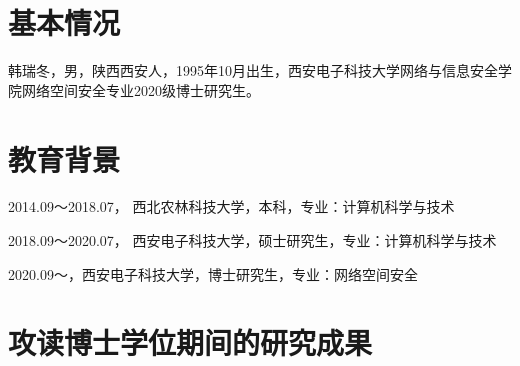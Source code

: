 \section{基本情况}
韩瑞冬，男，陕西西安人，1995年10月出生，西安电子科技大学网络与信息安全学院网络空间安全专业2020级博士研究生。
\section{教育背景}
2014.09～2018.07， 西北农林科技大学，本科，专业：计算机科学与技术
\par
2018.09～2020.07， 西安电子科技大学，硕士研究生，专业：计算机科学与技术
\par
2020.09～，西安电子科技大学，博士研究生，专业：网络空间安全
\section{攻读博士学位期间的研究成果}

